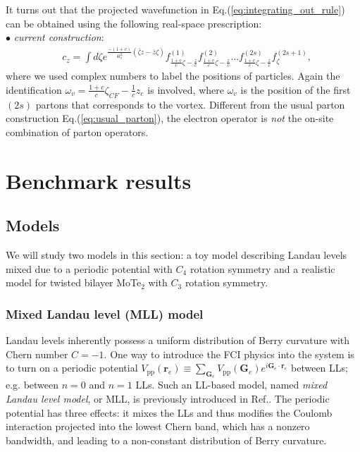 It turns out that the projected wavefunction in Eq.(\ref{eq:integrating_out_rule}) can be obtained using the following real-space prescription:\\
\indent $\bullet$ \emph{current construction}:
\begin{align}
     & c_{z}=\int d\zeta e^{\frac{-(1+c)}{4l_e^2}(\bar\zeta z-\bar z\zeta)} f^{(1)}_{\frac{1+c}{c}\zeta-\frac{z}{c} }f^{(2)}_{\frac{1+c}{c}\zeta-\frac{z}{c}}... f^{(2s)}_{\frac{1+c}{c}\zeta-\frac{z}{c}} f^{(2s+1)}_{\zeta}, \label{eq:current_parton}
\end{align}
where we used complex numbers to label the positions of particles. Again the identification $\omega_v=\frac{1+c}{c}\zeta_{CF}-\frac{1}{c}z_e$ is involved, where $\omega_v$ is the position of the first $(2s)$ partons that corresponds to the vortex. Different from the usual parton construction Eq.(\ref{eq:usual_parton}), the electron operator is \emph{not} the on-site combination of parton operators.

\section{Benchmark results}\label{sec:benchmark}
\subsection{Models}
We will study two models in this section: a toy model describing Landau levels mixed due to a periodic potential with $C_4$ rotation symmetry and a realistic model for twisted bilayer MoTe$_2$ with $C_3$ rotation symmetry.
\subsubsection{Mixed Landau level (MLL) model}
Landau levels inherently possess a uniform distribution of Berry curvature with Chern number $C=-1$. One way to introduce the FCI physics into the system is to turn on a periodic potential $V_{\text{pp}}(\mathbf{r}_e)\equiv\sum_{\mathbf{G}_e} V_{\text{pp}}(\mathbf{G}_e)e^{i\mathbf{G}_e\cdot\mathbf{r}_e}$ between LLs; e.g. between $n=0$ and $n=1$ LLs. Such an LL-based model, named \emph{mixed Landau level model}, or MLL, is previously introduced in Ref.\cite{murthy2012hamiltonian}. The periodic potential has three effects: it mixes the LLs and thus modifies the Coulomb interaction projected into the lowest Chern band, which has a nonzero bandwidth, and leading to a non-constant distribution of Berry curvature.

